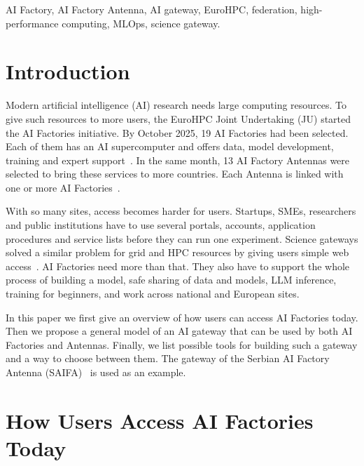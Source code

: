 \documentclass[conference,a4paper]{IEEEtran}
\begin{document}
\begin{IEEEkeywords}
AI Factory, AI Factory Antenna, AI gateway, EuroHPC, federation, high-performance computing, MLOps, science gateway.
\end{IEEEkeywords}

\section{Introduction}

Modern artificial intelligence (AI) research needs large computing resources. To give such resources to more users, the EuroHPC Joint Undertaking (JU) started the AI Factories initiative. By October 2025, 19 AI Factories had been selected. Each of them has an AI supercomputer and offers data, model development, training and expert support~\cite{eurohpc_aif,eurohpc_six_aif}. In the same month, 13 AI Factory Antennas were selected to bring these services to more countries. Each Antenna is linked with one or more AI Factories~\cite{eurohpc_antennas,eurohpc_antennas_page}.

With so many sites, access becomes harder for users. Startups, SMEs, researchers and public institutions have to use several portals, accounts, application procedures and service lists before they can run one experiment. Science gateways solved a similar problem for grid and HPC resources by giving users simple web access~\cite{wilkinsdiehr2007,hudak2018ood}. AI Factories need more than that. They also have to support the whole process of building a model, safe sharing of data and models, LLM inference, training for beginners, and work across national and European sites.

In this paper we first give an overview of how users can access AI Factories today. Then we propose a general model of an AI gateway that can be used by both AI Factories and Antennas. Finally, we list possible tools for building such a gateway and a way to choose between them. The gateway of the Serbian AI Factory Antenna (SAIFA)~\cite{cordis_saifa,saifa_d31} is used as an example.

\section{How Users Access AI Factories Today}
\end{document}
